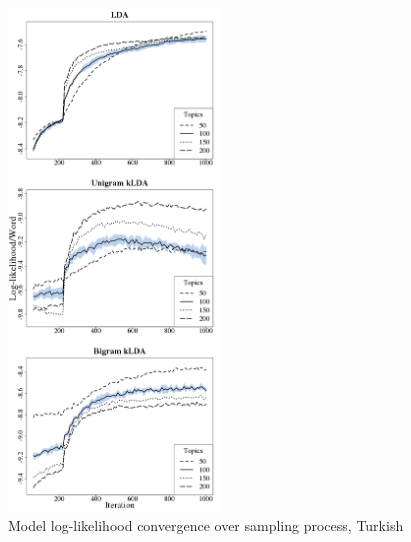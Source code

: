 \begin{figure}[t]
\begin{center}
\includegraphics[width=0.5\textwidth]{graphs/ch6/ll/turkish-lda-ll.png}
\end{center}
\caption[Log-Likelihood convergence, Turkish]{Model log-likelihood convergence over sampling process, Turkish\label{figC:llTurkish}}
\end{figure}

